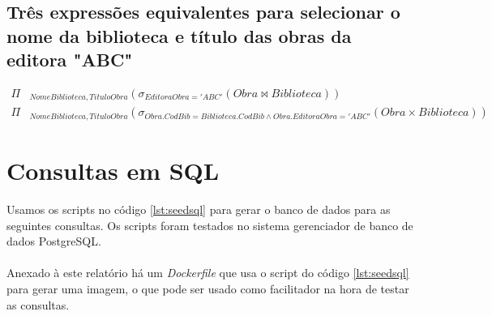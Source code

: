 \documentclass[12pt]{article}
\begin{document}
  \subsection{Três expressões equivalentes para selecionar o nome da biblioteca e título das obras da editora "ABC"}
    \begin{align*}
      \Pi&_{\mathit{NomeBiblioteca}, \mathit{TituloObra}}(\sigma_{\mathit{EditoraObra} = \mathit{'ABC'}}(\mathit{Obra} \bowtie \mathit{Biblioteca})) \\
      \Pi&_{\mathit{NomeBiblioteca}, \mathit{TituloObra}}(\sigma_{\mathit{Obra.CodBib} = \mathit{Biblioteca.CodBib} \land \mathit{Obra.EditoraObra} = \mathit{'ABC'}}(\mathit{Obra} \times \mathit{Biblioteca}))
    \end{align*}

\newpage

\section{Consultas em SQL}
Usamos os scripts no código \ref{lst:seedsql} para gerar o banco de dados para as seguintes consultas. Os scripts foram testados no sistema gerenciador de banco de dados PostgreSQL.\\\\
Anexado à este relatório há um \textit{Dockerfile} que usa o script do código \ref{lst:seedsql} para gerar uma imagem, o que pode ser usado como facilitador na hora de testar as consultas.
\end{document}
